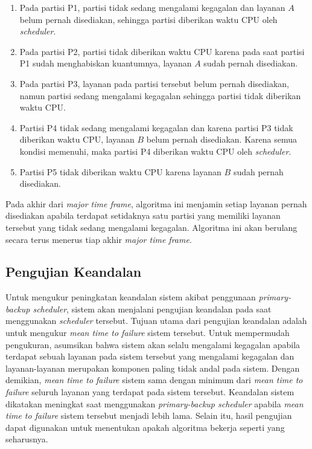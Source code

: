 \begin{enumerate}

	\item Pada partisi P1, partisi tidak sedang mengalami kegagalan dan
		layanan $A$ belum pernah disediakan, sehingga partisi diberikan waktu
		CPU oleh \textit{scheduler}.

	\item Pada partisi P2, partisi tidak diberikan waktu CPU karena pada saat partisi P1
		sudah menghabiskan kuantumnya, layanan $A$ sudah pernah disediakan.

	\item Pada partisi P3, layanan pada partisi tersebut belum pernah disediakan,
		namun partisi sedang mengalami kegagalan sehingga partisi tidak diberikan waktu
		CPU.

	\item Partisi P4 tidak sedang mengalami kegagalan dan karena partisi P3 tidak diberikan
		waktu CPU, layanan $B$ belum pernah disediakan. Karena semua kondisi
		memenuhi, maka partisi P4 diberikan waktu CPU oleh \textit{scheduler}.

	\item Partisi P5 tidak diberikan waktu CPU karena layanan $B$ sudah pernah
		disediakan.

\end{enumerate}

Pada akhir dari \textit{major time frame}, algoritma ini menjamin setiap layanan pernah
disediakan apabila terdapat setidaknya satu partisi yang memiliki layanan tersebut yang
tidak sedang mengalami kegagalan. Algoritma ini akan berulang secara terus menerus tiap akhir
\textit{major time frame}.

\subsection{Pengujian Keandalan}

Untuk mengukur peningkatan keandalan sistem akibat penggunaan \textit{primary-backup scheduler},
sistem akan menjalani pengujian keandalan pada saat menggunakan \textit{scheduler} tersebut.
Tujuan utama dari pengujian keandalan adalah untuk mengukur \textit{mean time to failure} sistem
tersebut. Untuk mempermudah pengukuran, asumsikan bahwa sistem akan selalu mengalami kegagalan
apabila terdapat sebuah layanan pada sistem tersebut yang mengalami kegagalan dan
layanan-layanan merupakan komponen paling tidak andal pada sistem. Dengan demikian, \textit{mean
time to failure} sistem sama dengan minimum dari \textit{mean time to failure} seluruh layanan
yang terdapat pada sistem tersebut. Keandalan sistem dikatakan meningkat saat menggunakan
\textit{primary-backup scheduler} apabila \textit{mean time to failure} sistem tersebut menjadi
lebih lama. Selain itu, hasil pengujian dapat digunakan untuk menentukan apakah algoritma
bekerja seperti yang seharusnya.


